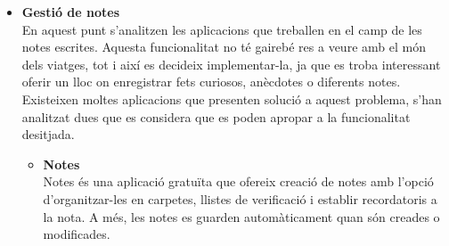 \begin{itemize}
\begin{itemize}
\end{itemize}
\item{\textbf{Gestió de notes}}\\
En aquest punt s'analitzen les aplicacions que treballen en el camp de les notes escrites. Aquesta funcionalitat no té gairebé res a veure amb el món dels viatges, tot i així es decideix implementar-la, ja que es troba interessant oferir un lloc on enregistrar fets curiosos, anècdotes o diferents notes.\\
Existeixen moltes aplicacions que presenten solució a aquest problema, s'han analitzat dues que es considera que es poden apropar a la funcionalitat desitjada.
\begin{itemize}
\item{\textbf{Notes}}\\
Notes és una aplicació gratuïta que ofereix creació de notes amb l'opció d'organitzar-les en carpetes, llistes de verificació i establir recordatoris a la nota. A més, les notes es guarden automàticament quan són creades o modificades.

\clearpage


\end{itemize}
\end{itemize}
